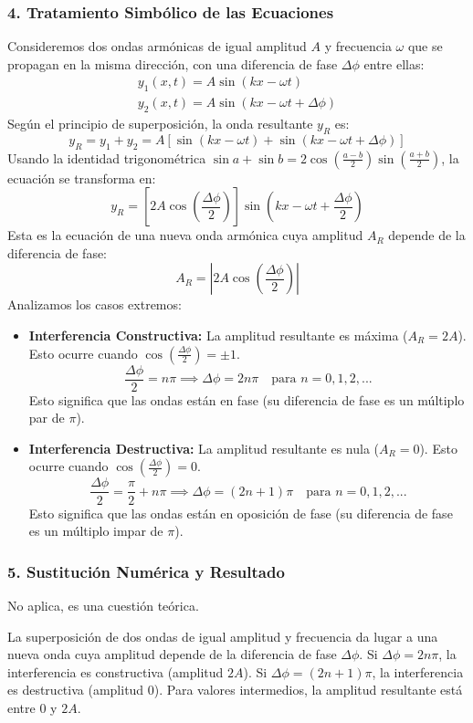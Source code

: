\subsubsection*{4. Tratamiento Simbólico de las Ecuaciones}
Consideremos dos ondas armónicas de igual amplitud $A$ y frecuencia $\omega$ que se propagan en la misma dirección, con una diferencia de fase $\Delta\phi$ entre ellas:
\begin{gather}
    y_1(x,t) = A \sin(kx - \omega t) \\
    y_2(x,t) = A \sin(kx - \omega t + \Delta\phi)
\end{gather}
Según el principio de superposición, la onda resultante $y_R$ es:
$$y_R = y_1 + y_2 = A [\sin(kx - \omega t) + \sin(kx - \omega t + \Delta\phi)]$$
Usando la identidad trigonométrica $\sin a + \sin b = 2 \cos\left(\frac{a-b}{2}\right) \sin\left(\frac{a+b}{2}\right)$, la ecuación se transforma en:
$$y_R = \left[ 2A \cos\left(\frac{\Delta\phi}{2}\right) \right] \sin\left(kx - \omega t + \frac{\Delta\phi}{2}\right)$$
Esta es la ecuación de una nueva onda armónica cuya amplitud $A_R$ depende de la diferencia de fase:
$$A_R = \left| 2A \cos\left(\frac{\Delta\phi}{2}\right) \right|$$
Analizamos los casos extremos:
\begin{itemize}
    \item \textbf{Interferencia Constructiva:} La amplitud resultante es máxima ($A_R = 2A$). Esto ocurre cuando $\cos\left(\frac{\Delta\phi}{2}\right) = \pm 1$.
    $$\frac{\Delta\phi}{2} = n\pi \implies \Delta\phi = 2n\pi \quad \text{para } n = 0, 1, 2, ...$$
    Esto significa que las ondas están en fase (su diferencia de fase es un múltiplo par de $\pi$).
    \item \textbf{Interferencia Destructiva:} La amplitud resultante es nula ($A_R = 0$). Esto ocurre cuando $\cos\left(\frac{\Delta\phi}{2}\right) = 0$.
    $$\frac{\Delta\phi}{2} = \frac{\pi}{2} + n\pi \implies \Delta\phi = (2n+1)\pi \quad \text{para } n = 0, 1, 2, ...$$
    Esto significa que las ondas están en oposición de fase (su diferencia de fase es un múltiplo impar de $\pi$).
\end{itemize}

\subsubsection*{5. Sustitución Numérica y Resultado}
No aplica, es una cuestión teórica.
\begin{cajaresultado}
La superposición de dos ondas de igual amplitud y frecuencia da lugar a una nueva onda cuya amplitud depende de la diferencia de fase $\Delta\phi$. Si $\Delta\phi=2n\pi$, la interferencia es constructiva (amplitud $2A$). Si $\Delta\phi=(2n+1)\pi$, la interferencia es destructiva (amplitud 0). Para valores intermedios, la amplitud resultante está entre 0 y $2A$.
\end{cajaresultado}

